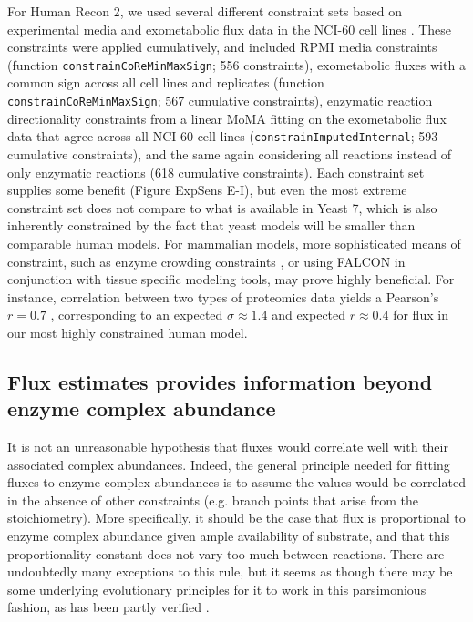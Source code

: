 For Human Recon 2, we used several different constraint sets based on
experimental media and exometabolic flux data in the NCI-60 cell lines
\citep{Jain2012}. These constraints were applied cumulatively, and
included RPMI media constraints (function
\texttt{constrainCoReMinMaxSign}; 556 constraints), exometabolic
fluxes with a common sign across all cell lines and replicates
(function \texttt{constrainCoReMinMaxSign}; 567 cumulative
constraints), enzymatic reaction directionality constraints from a
linear MoMA fitting on the exometabolic flux data that agree
across all NCI-60 cell lines (\texttt{constrainImputed\-Internal}; 593
cumulative constraints), and the same again considering all reactions
instead of only enzymatic reactions (618 cumulative constraints). Each
constraint set supplies some benefit (Figure ExpSens E-I), but even
the most extreme constraint set does not compare to what is available
in Yeast 7, which is also inherently constrained by the fact that
yeast models will be smaller than comparable human models.  For
mammalian models, more sophisticated means of constraint, such as
enzyme crowding constraints \citep{Shlomi2011}, or using FALCON in
conjunction with tissue specific modeling tools, may prove highly 
beneficial. For instance, correlation between two types of proteomics
data yields a Pearson's $r = 0.7$ \citep{Gholami2013}, corresponding
to an expected $\sigma \approx 1.4$ and expected $r \approx 0.4$ for
flux in our most highly constrained human model.

\subsection{Flux estimates provides information beyond enzyme complex abundance}
It is not an unreasonable hypothesis that fluxes would correlate well
with their associated complex abundances. Indeed, the general
principle needed for fitting fluxes to enzyme complex abundances is to
assume the values would be correlated in the absence of other
constraints (e.g. branch points that arise from the
stoichiometry). More specifically, it should be the case that flux is
proportional to enzyme complex abundance given ample availability of
substrate, and that this proportionality constant does not vary too
much between reactions.  There are undoubtedly many exceptions to this
rule, but it seems as though there may be some underlying evolutionary
principles for it to work in this parsimonious fashion, as has been
partly verified \citep{Bennett2009}.

